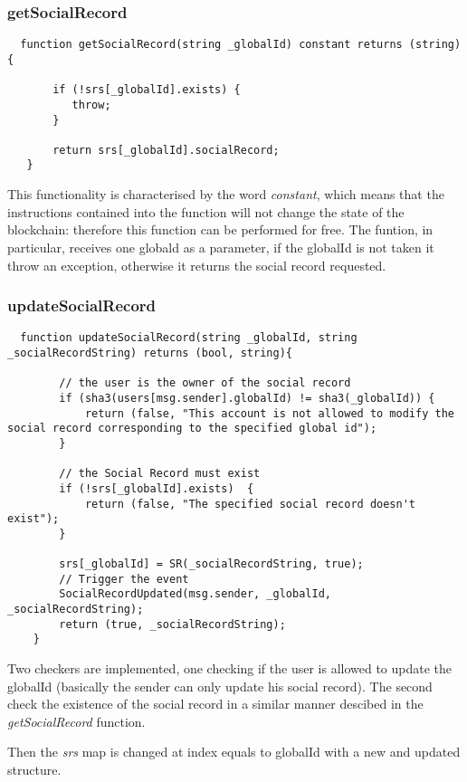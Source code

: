 \subsubsection{getSocialRecord}

\begin{lstlisting}
  function getSocialRecord(string _globalId) constant returns (string) {

       if (!srs[_globalId].exists) {
          throw;
       }

       return srs[_globalId].socialRecord;
   }
\end{lstlisting}
This functionality is characterised by the word \textit{constant}, which means that the instructions contained into the function will not change the state of the blockchain: therefore this function can be performed for free.
The funtion, in particular, receives one globald as a parameter, if the globalId is not taken it throw an exception, otherwise it returns the social record requested.

\subsubsection{updateSocialRecord}
\begin{lstlisting}
  function updateSocialRecord(string _globalId, string _socialRecordString) returns (bool, string){

        // the user is the owner of the social record
        if (sha3(users[msg.sender].globalId) != sha3(_globalId)) {
            return (false, "This account is not allowed to modify the social record corresponding to the specified global id");
        }

        // the Social Record must exist
        if (!srs[_globalId].exists)  {
            return (false, "The specified social record doesn't exist");
        }

        srs[_globalId] = SR(_socialRecordString, true);
        // Trigger the event
        SocialRecordUpdated(msg.sender, _globalId, _socialRecordString);
        return (true, _socialRecordString);
    }
\end{lstlisting}

Two checkers are implemented, one checking if the user is allowed to update the globalId (basically the sender can only update his social record).
The second check the existence of the social record in a similar manner descibed in the \textit{getSocialRecord} function.

Then the \textit{srs} map is changed at index equals to globalId with a new and updated structure.


